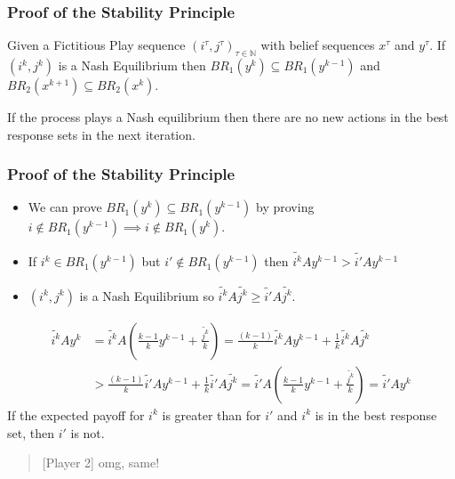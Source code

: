 \documentclass[pdf]{beamer}
\newcommand{\pstrat}{\widetilde}
\begin{document}
\begin{frame}
    \frametitle{Proof of the Stability Principle}
    \begin{lemma}[2]
        Given a Fictitious Play sequence $(i^\tau, j^\tau)_{\tau \in \mathbb{N}}$ with belief sequences $x^\tau$ and $y^\tau$. If $(i^k, j^k)$ is a Nash Equilibrium then $BR_1(y^{k}) \subseteq BR_1(y^{k-1})$ and $BR_2(x^{k+1}) \subseteq BR_2(x^{k})$.
    \end{lemma}
    \pause If the process plays a Nash equilibrium then there are no new actions in the best response sets in the next iteration.
\end{frame}

\begin{frame}
    \frametitle{Proof of the Stability Principle}
    \begin{itemize}
        \item We can prove $BR_1(y^{k}) \subseteq BR_1(y^{k-1})$ by proving $i \notin BR_1(y^{k-1}) \implies i \notin BR_1(y^{k})$.
        \item \pause If $i^k \in BR_1(y^{k-1})$ but $i' \notin BR_1(y^{k-1})$ then $\pstrat{i^k}Ay^{k-1} > \pstrat{i'}Ay^{k-1}$
        \item \pause $(i^k, j^k)$ is a Nash Equilibrium so $\pstrat{i^k}A\pstrat{j^k} \ge \pstrat{i'}A\pstrat{j^k}$.
    \end{itemize}
    \pause
    \begin{align*}
        \pstrat{i^k}Ay^k &= \pstrat{i^k}A(\frac{k - 1}{k} y^{k-1} + \frac{\pstrat{j^k}}{k}) = \frac{(k - 1)}{k} \pstrat{i^k}Ay^{k-1} + \frac{1}{k}\pstrat{i^k}A\pstrat{j^k}\\
        &> \frac{(k - 1)}{k} \pstrat{i'}Ay^{k-1} + \frac{1}{k}\pstrat{i'}A\pstrat{j^k} = \pstrat{i'}A(\frac{k - 1}{k} y^{k-1} + \frac{\pstrat{j^k}}{k}) = \pstrat{i'}Ay^k
    \end{align*}
    \pause If the expected payoff for $i^k$ is greater than for $i'$ and $i^k$ is in the best response set, then $i'$ is not.
    
    \begin{quote}[Player 2]
        omg, same!
    \end{quote}
\end{frame}
\end{document}
